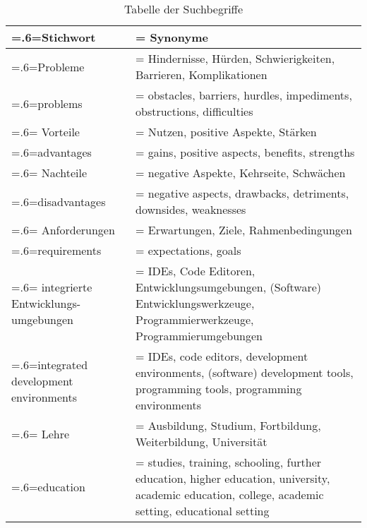 \begin{table}[htbp]
    \centering
    \begin{tabularx}{\textwidth}{| >{\hsize=.6\hsize\linewidth=\hsize}X |
            >{\hsize=1.4\hsize\linewidth=\hsize}X |}
        \hline
        Stichwort                           & Synonyme                                                                                                                   \\
        \hline
        Probleme                            & Hindernisse, Hürden, Schwierigkeiten, Barrieren, Komplikationen                                                            \\ problems                            & obstacles, barriers, hurdles, impediments, obstructions, difficulties \\
        \hline
        Vorteile                            & Nutzen, positive Aspekte, Stärken                                                                                          \\ advantages                          & gains, positive aspects, benefits, strengths \\
        \hline
        Nachteile                           & negative Aspekte, Kehrseite, Schwächen                                                                                     \\ disadvantages                       & negative aspects, drawbacks, detriments, downsides, weaknesses \\
        \hline
        Anforderungen                       & Erwartungen, Ziele, Rahmenbedingungen                                                                                      \\ requirements                        & expectations, goals \\
        \hline
        integrierte Entwicklungs-umgebungen & IDEs, Code Editoren, Entwicklungsumgebungen, (Software) Entwicklungswerkzeuge, Programmierwerkzeuge, Programmierumgebungen \\ integrated development environments & IDEs, code editors, development environments, (software) development tools, programming tools, programming environments \\
        \hline
        Lehre                               & Ausbildung, Studium, Fortbildung, Weiterbildung, Universität                                                               \\ education                           & studies, training, schooling, further education, higher education, university, academic education, college, academic setting, educational setting  \\
        \hline
    \end{tabularx}
    \caption{Tabelle der Suchbegriffe}
    \label{table:search-terms}
\end{table}

